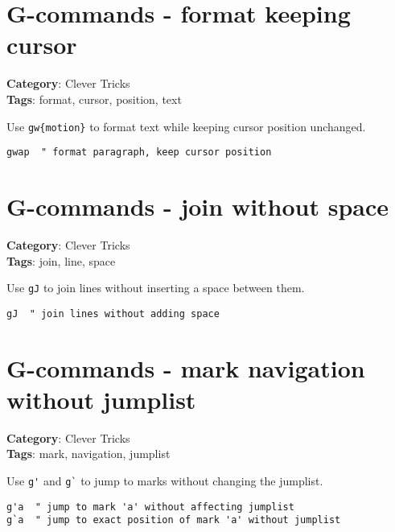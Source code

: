 {{{\section{G-commands - format keeping cursor}

\textbf{Category}: Clever Tricks\\ \textbf{Tags}: format, cursor, position, text
\vspace{0.5cm}

Use {\footnotesize \Verb§gw{motion}§} to format text while keeping cursor position unchanged.

\begin{Exa*}{}
\begin{Verbatim}[fontsize=\footnotesize, breaklines, breakanywhere]
gwap  " format paragraph, keep cursor position
\end{Verbatim}
\end{Exa*}

\section{G-commands - join without space}

\textbf{Category}: Clever Tricks\\ \textbf{Tags}: join, line, space
\vspace{0.5cm}

Use {\footnotesize \Verb§gJ§} to join lines without inserting a space between them.

\begin{Exa*}{}
\begin{Verbatim}[fontsize=\footnotesize, breaklines, breakanywhere]
gJ  " join lines without adding space
\end{Verbatim}
\end{Exa*}

\section{G-commands - mark navigation without jumplist}

\textbf{Category}: Clever Tricks\\ \textbf{Tags}: mark, navigation, jumplist
\vspace{0.5cm}

Use {\footnotesize \Verb§g'§} and {\footnotesize \Verb§g`§} to jump to marks without changing the jumplist.

\begin{Exa*}{}
\begin{Verbatim}[fontsize=\footnotesize, breaklines, breakanywhere]
g'a  " jump to mark 'a' without affecting jumplist
g`a  " jump to exact position of mark 'a' without jumplist
\end{Verbatim}
\end{Exa*}

}}}
